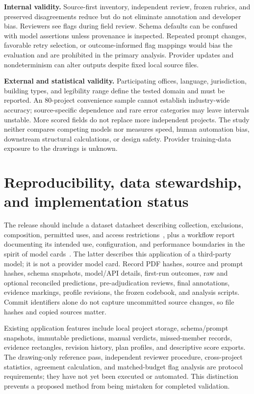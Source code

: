 \documentclass[11pt]{article}
\begin{document}
\textbf{Internal validity.} Source-first inventory, independent review, frozen rubrics, and preserved disagreements reduce but do not eliminate annotation and developer bias. Reviewers see flags during field review. Schema defaults can be confused with model assertions unless provenance is inspected. Repeated prompt changes, favorable retry selection, or outcome-informed flag mappings would bias the evaluation and are prohibited in the primary analysis. Provider updates and nondeterminism can alter outputs despite fixed local source files.

\textbf{External and statistical validity.} Participating offices, language, jurisdiction, building types, and legibility range define the tested domain and must be reported. An 80-project convenience sample cannot establish industry-wide accuracy; source-specific dependence and rare error categories may leave intervals unstable. More scored fields do not replace more independent projects. The study neither compares competing models nor measures speed, human automation bias, downstream structural calculations, or design safety. Provider training-data exposure to the drawings is unknown.

\section{Reproducibility, data stewardship, and implementation status}
The release should include a dataset datasheet describing collection, exclusions, composition, permitted uses, and access restrictions~\cite{gebru2021}, plus a workflow report documenting its intended use, configuration, and performance boundaries in the spirit of model cards~\cite{mitchell2019}. The latter describes this application of a third-party model; it is not a provider model card. Record PDF hashes, source and prompt hashes, schema snapshots, model/API details, first-run outcomes, raw and optional reconciled predictions, pre-adjudication reviews, final annotations, evidence markings, profile revisions, the frozen codebook, and analysis scripts. Commit identifiers alone do not capture uncommitted source changes, so file hashes and copied sources matter.

Existing application features include local project storage, schema/prompt snapshots, immutable predictions, manual verdicts, missed-member records, evidence rectangles, revision history, plan profiles, and descriptive score exports. The drawing-only reference pass, independent reviewer procedure, cross-project statistics, agreement calculation, and matched-budget flag analysis are protocol requirements; they have not yet been executed or automated. This distinction prevents a proposed method from being mistaken for completed validation.
\end{document}
